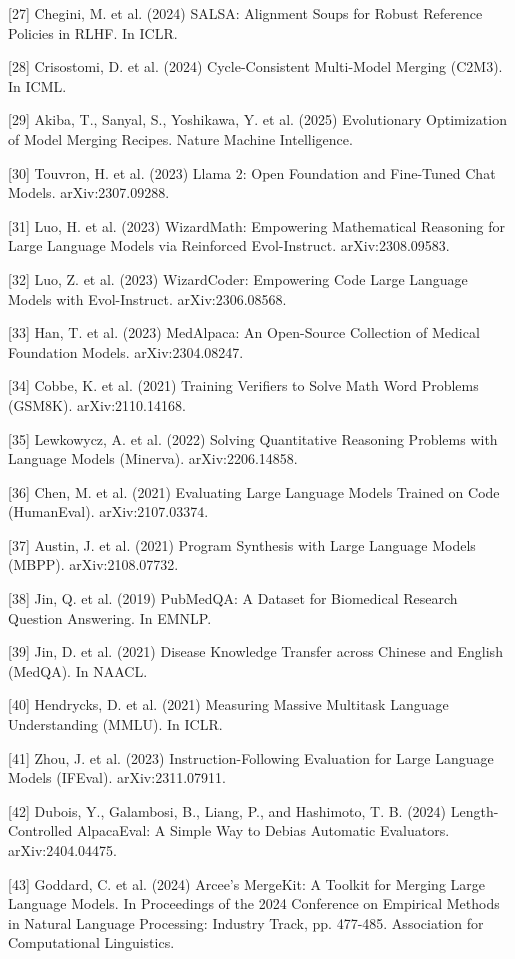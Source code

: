 \documentclass{article}
\begin{document}
{[27] Chegini, M. et al. (2024) SALSA: Alignment Soups for Robust Reference Policies in RLHF. In ICLR.

[28] Crisostomi, D. et al. (2024) Cycle-Consistent Multi-Model Merging (C2M3). In ICML.

[29] Akiba, T., Sanyal, S., Yoshikawa, Y. et al. (2025) Evolutionary Optimization of Model Merging Recipes. Nature Machine Intelligence.

[30] Touvron, H. et al. (2023) Llama 2: Open Foundation and Fine-Tuned Chat Models. arXiv:2307.09288.

[31] Luo, H. et al. (2023) WizardMath: Empowering Mathematical Reasoning for Large Language Models via Reinforced Evol-Instruct. arXiv:2308.09583.

[32] Luo, Z. et al. (2023) WizardCoder: Empowering Code Large Language Models with Evol-Instruct. arXiv:2306.08568.

[33] Han, T. et al. (2023) MedAlpaca: An Open-Source Collection of Medical Foundation Models. arXiv:2304.08247.

[34] Cobbe, K. et al. (2021) Training Verifiers to Solve Math Word Problems (GSM8K). arXiv:2110.14168.

[35] Lewkowycz, A. et al. (2022) Solving Quantitative Reasoning Problems with Language Models (Minerva). arXiv:2206.14858.

[36] Chen, M. et al. (2021) Evaluating Large Language Models Trained on Code (HumanEval). arXiv:2107.03374.

[37] Austin, J. et al. (2021) Program Synthesis with Large Language Models (MBPP). arXiv:2108.07732.

[38] Jin, Q. et al. (2019) PubMedQA: A Dataset for Biomedical Research Question Answering. In EMNLP.

[39] Jin, D. et al. (2021) Disease Knowledge Transfer across Chinese and English (MedQA). In NAACL.

[40] Hendrycks, D. et al. (2021) Measuring Massive Multitask Language Understanding (MMLU). In ICLR.

[41] Zhou, J. et al. (2023) Instruction-Following Evaluation for Large Language Models (IFEval). arXiv:2311.07911.

[42] Dubois, Y., Galambosi, B., Liang, P., and Hashimoto, T. B. (2024) Length-Controlled AlpacaEval: A Simple Way to Debias Automatic Evaluators. arXiv:2404.04475.

[43] Goddard, C. et al. (2024) Arcee’s MergeKit: A Toolkit for Merging Large Language Models. In Proceedings of the 2024 Conference on Empirical Methods in Natural Language Processing: Industry Track, pp. 477-485. Association for Computational Linguistics.  

}
\end{document}
